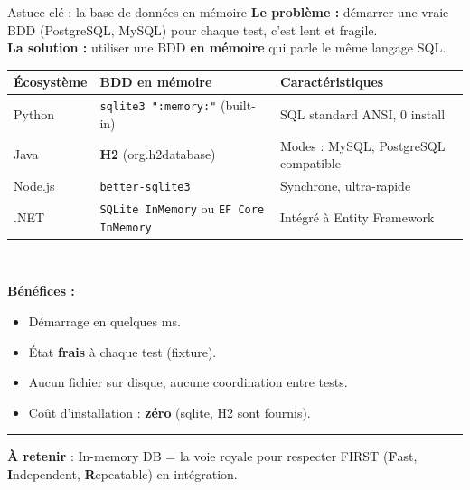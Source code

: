 \documentclass[aspectratio=169,11pt]{beamer}
\newcommand{\takeaway}[1]{%
\vfill\begin{beamercolorbox}[wd=\linewidth,sep=0.4em]{}
\color{accent2}\rule[0.6ex]{1.2em}{1.2pt}\hspace{0.4em}%
\textbf{\color{accent2}\small À retenir} \textcolor{textsoft}{:} %
{\small\color{textmain}#1}
\end{beamercolorbox}}
\begin{document}
\begin{frame}[t,shrink=15]{Astuce clé : la base de données en mémoire}
\footnotesize
\textbf{Le problème :} démarrer une vraie BDD (PostgreSQL, MySQL) pour chaque test, c'est lent et fragile.\\[0.4em]

\textbf{La solution :} utiliser une BDD \textbf{en mémoire} qui parle le même langage SQL.\\[0.5em]

\centering
\begin{tabular}{@{}p{3cm} p{4.5cm} p{5cm}@{}}
\toprule
\textbf{Écosystème} & \textbf{BDD en mémoire} & \textbf{Caractéristiques} \\
\midrule
Python & \texttt{sqlite3 ":memory:"} (built-in) & SQL standard ANSI, 0 install \\
\addlinespace[0.15em]
Java & \textbf{H2} (org.h2database) & Modes : MySQL, PostgreSQL compatible \\
\addlinespace[0.15em]
Node.js & \texttt{better-sqlite3} & Synchrone, ultra-rapide \\
\addlinespace[0.15em]
.NET & \texttt{SQLite InMemory} ou \texttt{EF Core InMemory} & Intégré à Entity Framework \\
\bottomrule
\end{tabular}

\\
\vspace{0.5cm}\raggedright
\textbf{Bénéfices :}
\begin{itemize}\itemsep0.05em
\item Démarrage en quelques ms.
\item État \textbf{frais} à chaque test (fixture).
\item Aucun fichier sur disque, aucune coordination entre tests.
\item Coût d'installation : \textbf{zéro} (sqlite, H2 sont fournis).
\end{itemize}
\takeaway{In-memory DB = la voie royale pour respecter FIRST (\textbf{F}ast, \textbf{I}ndependent, \textbf{R}epeatable) en intégration.}
\end{frame}
\end{document}
